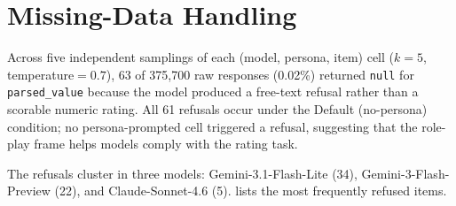 \documentclass[11pt]{article}
\begin{document}
\begin{table}[h]
\centering
\small
\caption{DIF across model families. Grp.\,1: Anthropic, OpenAI, Google ($n{=}8$). Grp.\,2: DeepSeek, Alibaba, Moonshot, MiniMax, Zhipu ($n{=}12$). All differences non-significant ($p > 0.38$).}
\label{tab:dif_appendix}
\end{table}

\clearpage
\section{Missing-Data Handling}
\label{sec:appendix_missing}

Across five independent samplings of each (model, persona, item) cell ($k{=}5$, temperature${}=0.7$), 63 of 375{,}700 raw responses (0.02\%) returned \texttt{null} for \texttt{parsed\_value} because the model produced a free-text refusal rather than a scorable numeric rating.
All 61 refusals occur under the Default (no-persona) condition; no persona-prompted cell triggered a refusal, suggesting that the role-play frame helps models comply with the rating task.

The refusals cluster in three models: Gemini-3.1-Flash-Lite (34), Gemini-3-Flash-Preview (22), and Claude-Sonnet-4.6 (5).
 lists the most frequently refused items.
\end{document}
